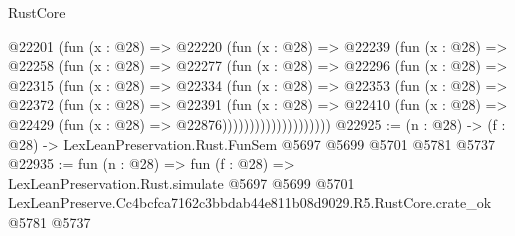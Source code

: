 \begin{lexlean}{RustCore}
\begin{coremodule}
                @22201
                  (fun (x : @28) =>
                  @22220
                    (fun (x : @28) =>
                    @22239
                      (fun (x : @28) =>
                      @22258
                        (fun (x : @28) =>
                        @22277
                          (fun (x : @28) =>
                          @22296
                            (fun (x : @28) =>
                            @22315
                              (fun (x : @28) =>
                              @22334
                                (fun (x : @28) =>
                                @22353
                                  (fun (x : @28) =>
                                  @22372
                                    (fun (x : @28) =>
                                    @22391
                                      (fun (x : @28) =>
                                      @22410
                                        (fun (x : @28) =>
                                        @22429 (fun (x : @28) => @22876))))))))))))))))))))
@22925 := (n : @28) -> (f : @28) -> LexLeanPreservation.Rust.FunSem @5697 @5699 @5701 @5781 @5737
@22935 := fun (n : @28) =>
  fun (f : @28) =>
  LexLeanPreservation.Rust.simulate
    @5697
    @5699
    @5701
    LexLeanPreserve.Cc4bcfca7162c3bbdab44e811b08d9029.R5.RustCore.crate_ok
    @5781
    @5737
\end{coremodule}
\end{lexlean}
